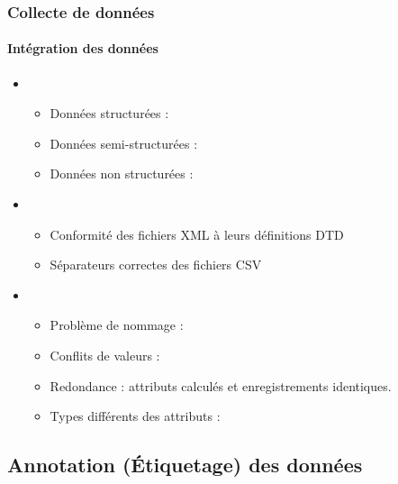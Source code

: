 \documentclass[xcolor=table]{beamer}
\begin{document}
\begin{frame}
\frametitle{Collecte de données}
\framesubtitle{Intégration des données}

\begin{itemize}
	\item {}
	\begin{itemize}
		\item Données structurées : 
		\item Données semi-structurées : 
		\item Données non structurées : 
	\end{itemize}
	\item {}
	\begin{itemize}
		\item Conformité des fichiers XML à leurs définitions DTD
		\item Séparateurs correctes des fichiers CSV
	\end{itemize}
	\item {}
	\begin{itemize}
		\item Problème de nommage : 
		\item Conflits de valeurs : 
		\item Redondance : attributs calculés et enregistrements identiques.
		\item Types différents des attributs : 
	\end{itemize}
\end{itemize}

\end{frame}


\subsection{Annotation (Étiquetage) des données}
\end{document}
